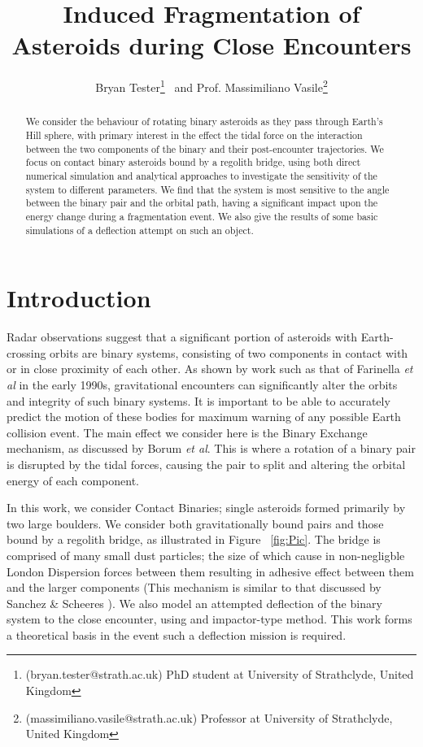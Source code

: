 \documentclass[letterpaper, preprint, paper,11pt]{AAS}	%
\begin{document}
\title{\textsf{\textbf{Induced Fragmentation of Asteroids during Close Encounters}}}
\author{\textsf{Bryan Tester}\thanks{(bryan.tester@strath.ac.uk) PhD student at University of Strathclyde, United Kingdom}
\ and \textsf{Prof. Massimiliano Vasile}\thanks{(massimiliano.vasile@strath.ac.uk) Professor at University of Strathclyde, United Kingdom}}

\maketitle{} 		


\begin{abstract}
We consider the behaviour of rotating binary asteroids as they pass through Earth's Hill sphere, with primary interest in the effect the tidal force on the interaction between the two components of the binary and their post-encounter trajectories. We focus on contact binary asteroids bound by a regolith bridge, using both direct numerical simulation and analytical approaches to investigate the sensitivity of the system to different parameters. We find that the system is most sensitive to the angle between the binary pair and the orbital path, having a significant impact upon the energy change during a fragmentation event. We also give the results of some basic simulations of a deflection attempt on such an object.
\end{abstract}

\section{Introduction}
Radar observations suggest that a significant portion of asteroids with Earth-crossing orbits are binary systems, consisting of two components in contact with or in close proximity of each other. As shown by work such as that of Farinella \textit{et al} \cite{binaryevo} in the early 1990s, gravitational encounters can significantly alter the orbits and integrity of such binary systems. It is important to be able to accurately predict the motion of these bodies for maximum warning of any possible Earth collision event. The main effect we consider here is the Binary Exchange mechanism, as discussed by Borum \textit{et al}\cite{exchange}. This is where a rotation of a binary pair is disrupted by the tidal forces, causing the pair to split and altering the orbital energy of each component. 

In this work, we consider Contact Binaries; single asteroids formed primarily by two large boulders. We consider both gravitationally bound pairs and those bound by a regolith bridge, as illustrated in Figure ~\ref{fig:Pic}. The bridge is comprised of many small dust particles; the size of which cause in non-negligble London Dispersion forces between them resulting in adhesive effect between them and the larger components (This mechanism is similar to that discussed by Sanchez \& Scheeres \cite{dustbound}). We also model an attempted deflection of the binary system to the close encounter, using and impactor-type method. This work forms a theoretical basis in the event such a deflection mission is required.
\end{document}
